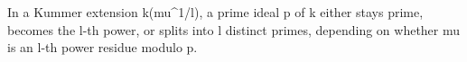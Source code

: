 In a Kummer extension k(mu^{1/l}), a prime ideal p of k either stays prime, becomes the l-th power, or splits into l distinct primes, depending on whether mu is an l-th power residue modulo p.
